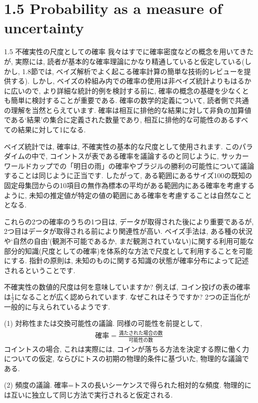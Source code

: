 \documentclass[10pt,dvipdfmx,a4]{beamer}
\newcommand{\eqn}[1]{\begin{align*}#1\end{align*}}
\begin{document}
\section{1.5 Probability as a measure of uncertainty}
\begin{frame}{1.5 不確実性の尺度としての確率}
我々はすでに確率密度などの概念を用いてきたが, 実際には, 読者が基本的な確率理論にかなり精通していると仮定している(しかし, 1.8節では, ベイズ解析でよく起こる確率計算の簡単な技術的レビューを提供する).
しかし, ベイズの枠組み内での確率の使用は非ベイズ統計よりもはるかに広いので, より詳細な統計的例を検討する前に, 確率の概念の基礎を少なくとも簡単に検討することが重要である.
確率の数学的定義について, 読者側で共通の理解を当然とらえています.
確率は相互に排他的な結果に対して非負の加算値である`結果'の集合に定義された数量であり, 相互に排他的な可能性のあるすべての結果に対して1になる.

ベイズ統計では, 確率は, 不確実性の基本的な尺度として使用されます.
このパラダイムの中で, コイントスが表である確率を議論するのと同じように, サッカーワールドカップでの「明日の雨」の確率やブラジルの勝利の可能性について議論することは同じように正当です.
したがって, ある範囲にあるサイズ100の既知の固定母集団からの10項目の無作為標本の平均がある範囲内にある確率を考慮するように, 未知の推定値が特定の値の範囲にある確率を考慮することは自然なこととなる.
\end{frame}


\begin{frame}
これらの2つの確率のうちの1つ目は, データが取得された後により重要であるが, 2つ目はデータが取得される前により関連性が高い.
ベイズ手法は, ある種の状況や`自然の自由'(観測不可能であるか, まだ観測されていない)に関する利用可能な部分的知識(尺度としての確率)を体系的な方法で尺度として利用することを可能にする.
指針の原則は, 未知のものに関する知識の状態が確率分布によって記述されるということです.

不確実性の数値的尺度は何を意味していますか?
例えば, コイン投げの表の確率は$\tfrac{1}{2}$になることが広く認められています.
なぜこれはそうですか?
2つの正当化が一般的に与えられているようです.

(1) 対称性または交換可能性の議論.
同様の可能性を前提として,
\eqn{\text{確率}=\frac{\text{満たされた場合の数}}{\text{可能性の数}}}
コイントスの場合, これは実際には, コインが落ちる方法を決定する際に働く力についての仮定, ならびにトスの初期の物理的条件に基づいた, 物理的な議論である.

(2) 頻度の議論.
確率=トスの長いシーケンスで得られた相対的な頻度.
物理的には互いに独立して同じ方法で実行されると仮定される.
\end{frame}
\end{document}
